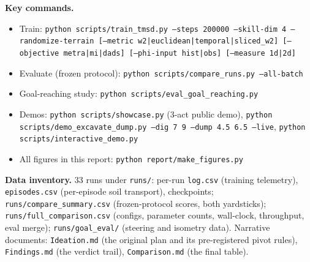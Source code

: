 \documentclass[11pt,a4paper]{article}
\begin{document}
\medskip
\textbf{Key commands.}
\begin{itemize}[leftmargin=6mm]\small
\item Train: \texttt{python scripts/train\_tmsd.py --steps 200000 --skill-dim 4
--randomize-terrain [--metric w2|euclidean|temporal|sliced\_w2]
[--objective metra|mi|dads] [--phi-input hist|obs] [--measure 1d|2d]}
\item Evaluate (frozen protocol): \texttt{python scripts/compare\_runs.py --all-batch}
\item Goal-reaching study: \texttt{python scripts/eval\_goal\_reaching.py}
\item Demos: \texttt{python scripts/showcase.py} (3-act public demo),
\texttt{python scripts/demo\_excavate\_dump.py --dig 7 9 --dump 4.5 6.5 --live},
\texttt{python scripts/interactive\_demo.py}
\item All figures in this report: \texttt{python report/make\_figures.py}
\end{itemize}

\medskip
\textbf{Data inventory.} 33 runs under \texttt{runs/}: per-run \texttt{log.csv}
(training telemetry), \texttt{episodes.csv} (per-episode soil transport),
checkpoints; \texttt{runs/compare\_summary.csv} (frozen-protocol scores, both
yardsticks); \texttt{runs/full\_comparison.csv} (configs, parameter counts,
wall-clock, throughput, eval merge); \texttt{runs/goal\_eval/} (steering and
isometry data). Narrative documents: \texttt{Ideation.md} (the original plan and
its pre-registered pivot rules), \texttt{Findings.md} (the verdict trail),
\texttt{Comparison.md} (the final table).
\end{document}
